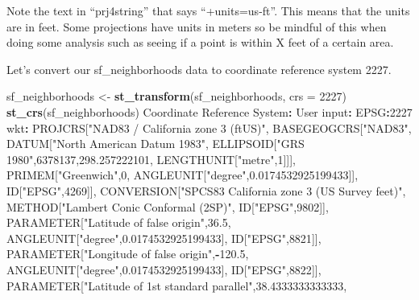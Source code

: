 \documentclass[
  12pt,
]{book}
\newenvironment{Shaded}{\begin{snugshade}}{\end{snugshade}}
\newcommand{\DataTypeTok}[1]{\textcolor[rgb]{0.27,0.27,0.27}{#1}}
\newcommand{\DecValTok}[1]{\textcolor[rgb]{0.06,0.06,0.06}{#1}}
\newcommand{\FloatTok}[1]{\textcolor[rgb]{0.06,0.06,0.06}{#1}}
\newcommand{\KeywordTok}[1]{\textcolor[rgb]{0.27,0.27,0.27}{\textbf{#1}}}
\newcommand{\NormalTok}[1]{#1}
\newcommand{\OperatorTok}[1]{\textcolor[rgb]{0.43,0.43,0.43}{\textbf{#1}}}
\newcommand{\StringTok}[1]{\textcolor[rgb]{0.5,0.5,0.5}{#1}}
\begin{document}
Note the text in ``prj4string'' that says ``+units=us-ft''. This means that the units are in feet. Some projections have units in meters so be mindful of this when doing some analysis such as seeing if a point is within X feet of a certain area.

Let's convert our sf\_neighborhoods data to coordinate reference system 2227.

\begin{Shaded}
\begin{Highlighting}[]
\NormalTok{sf\_neighborhoods <{-}}\StringTok{ }\KeywordTok{st\_transform}\NormalTok{(sf\_neighborhoods, }\DataTypeTok{crs =} \DecValTok{2227}\NormalTok{)}
\KeywordTok{st\_crs}\NormalTok{(sf\_neighborhoods)}
\NormalTok{Coordinate Reference System}\OperatorTok{:}
\StringTok{  }\NormalTok{User input}\OperatorTok{:}\StringTok{ }\NormalTok{EPSG}\OperatorTok{:}\DecValTok{2227} 
\NormalTok{  wkt}\OperatorTok{:}
\NormalTok{PROJCRS[}\StringTok{"NAD83 / California zone 3 (ftUS)"}\NormalTok{,}
\NormalTok{    BASEGEOGCRS[}\StringTok{"NAD83"}\NormalTok{,}
\NormalTok{        DATUM[}\StringTok{"North American Datum 1983"}\NormalTok{,}
\NormalTok{            ELLIPSOID[}\StringTok{"GRS 1980"}\NormalTok{,}\DecValTok{6378137}\NormalTok{,}\FloatTok{298.257222101}\NormalTok{,}
\NormalTok{                LENGTHUNIT[}\StringTok{"metre"}\NormalTok{,}\DecValTok{1}\NormalTok{]]],}
\NormalTok{        PRIMEM[}\StringTok{"Greenwich"}\NormalTok{,}\DecValTok{0}\NormalTok{,}
\NormalTok{            ANGLEUNIT[}\StringTok{"degree"}\NormalTok{,}\FloatTok{0.0174532925199433}\NormalTok{]],}
\NormalTok{        ID[}\StringTok{"EPSG"}\NormalTok{,}\DecValTok{4269}\NormalTok{]],}
\NormalTok{    CONVERSION[}\StringTok{"SPCS83 California zone 3 (US Survey feet)"}\NormalTok{,}
\NormalTok{        METHOD[}\StringTok{"Lambert Conic Conformal (2SP)"}\NormalTok{,}
\NormalTok{            ID[}\StringTok{"EPSG"}\NormalTok{,}\DecValTok{9802}\NormalTok{]],}
\NormalTok{        PARAMETER[}\StringTok{"Latitude of false origin"}\NormalTok{,}\FloatTok{36.5}\NormalTok{,}
\NormalTok{            ANGLEUNIT[}\StringTok{"degree"}\NormalTok{,}\FloatTok{0.0174532925199433}\NormalTok{],}
\NormalTok{            ID[}\StringTok{"EPSG"}\NormalTok{,}\DecValTok{8821}\NormalTok{]],}
\NormalTok{        PARAMETER[}\StringTok{"Longitude of false origin"}\NormalTok{,}\OperatorTok{{-}}\FloatTok{120.5}\NormalTok{,}
\NormalTok{            ANGLEUNIT[}\StringTok{"degree"}\NormalTok{,}\FloatTok{0.0174532925199433}\NormalTok{],}
\NormalTok{            ID[}\StringTok{"EPSG"}\NormalTok{,}\DecValTok{8822}\NormalTok{]],}
\NormalTok{        PARAMETER[}\StringTok{"Latitude of 1st standard parallel"}\NormalTok{,}\FloatTok{38.4333333333333}\NormalTok{,}

\end{Highlighting}
\end{Shaded}
\end{document}
